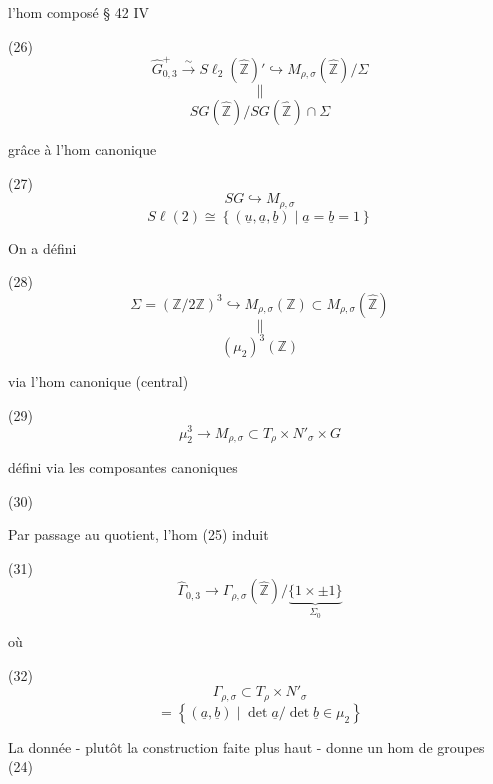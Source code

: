 \begin{enumerate}


\newpage


l'hom composé § 42 IV

(26) $$ \hat{G}_{0,3}^+ \overset{\sim}{\longrightarrow} S\ell_2(\hat{\mathbb{Z}})' \hookrightarrow M_{\rho,\sigma}(\hat{\mathbb{Z}})/\Sigma $$
$$ \parallel $$
$$ SG(\hat{\mathbb{Z}})/SG(\hat{\mathbb{Z}}) \cap \Sigma $$

grâce à l'hom canonique

(27) $$ SG \hookrightarrow M_{\rho,\sigma} $$
$$ S\ell(2) \cong \left\{ (\underline{u}, \underline{a}, \underline{b}) \mid \underline{a} = \underline{b} = 1 \right\} $$

On a défini

(28) $$ \Sigma = (\mathbb{Z}/2\mathbb{Z})^3 \hookrightarrow M_{\rho,\sigma}(\mathbb{Z}) \subset M_{\rho,\sigma}(\hat{\mathbb{Z}}) $$
$$ \parallel $$
$$ (\mu_2)^3(\mathbb{Z}) $$

via l'hom canonique (central)

(29) $$ \mu_2^3 \longrightarrow M_{\rho,\sigma} \subset T_{\rho} \times N'_{\sigma} \times G $$

défini via les composantes canoniques

(30) 

Par passage au quotient, l'hom (25)
induit

(31) $$ \hat{\Gamma}_{0,3} \longrightarrow \Gamma_{\rho,\sigma}(\hat{\mathbb{Z}})/ \underbrace{\{1 \times \pm 1 \}}_{\Sigma_0} $$

où

(32) $$ \Gamma_{\rho,\sigma} \subset T_{\rho} \times N'_{\sigma} $$
$$ = \left\{ (\underline{a}, \underline{b}) \mid \det \underline{a} / \det \underline{b} \in \mu_2 \right\} $$

La donnée - plutôt la construction faite
plus haut - donne un hom de groupes (24)

\newpage




\end{enumerate}
